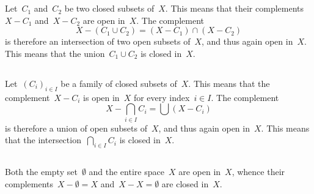 \section{}



\subsection{}

Let~$C_1$ and~$C_2$ be two closed subsets of~$X$.
This means that their complements~$X - C_1$ and~$X - C_2$ are open in~$X$.
The complement
\[
	X - (C_1 ∪ C_2)
	=
	(X - C_1) ∩ (X - C_2)
\]
is therefore an intersection of two open subsets of~$X$, and thus again open in~$X$.
This means that the union~$C_1 ∪ C_2$ is closed in~$X$.



\subsection{}

Let~$(C_i)_{i ∈ I}$ be a family of closed subsets of~$X$.
This means that the complement~$X - C_i$ is open in~$X$ for every index~$i ∈ I$.
The complement
\[
	X - ⋂_{i ∈ I} C_i
	=
	⋃{} (X - C_i)
\]
is therefore a union of open subsets of~$X$, and thus again open in~$X$.
This means that the intersection~$⋂_{i ∈ I} C_i$ is closed in~$X$.



\subsection{}

Both the empty set~$∅$ and the entire space~$X$ are open in~$X$, whence their complements~$X - ∅ = X$ and~$X - X = ∅$ are closed in~$X$.
